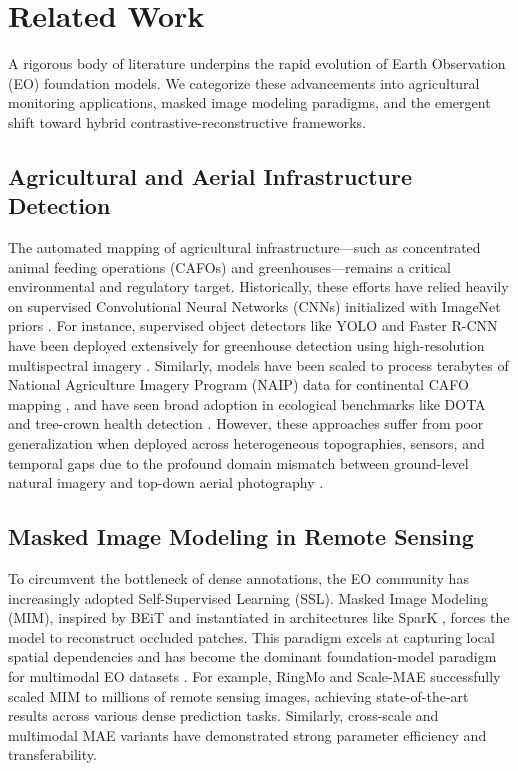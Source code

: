 \section{Related Work}
\label{sec:related_work}

A rigorous body of literature underpins the rapid evolution of Earth Observation (EO) foundation models. We categorize these advancements into agricultural monitoring applications, masked image modeling paradigms, and the emergent shift toward hybrid contrastive-reconstructive frameworks.

\subsection{Agricultural and Aerial Infrastructure Detection}
The automated mapping of agricultural infrastructure---such as concentrated animal feeding operations (CAFOs) and greenhouses---remains a critical environmental and regulatory target. Historically, these efforts have relied heavily on supervised Convolutional Neural Networks (CNNs) initialized with ImageNet priors \cite{wang2022empirical, robinson2021mapping}. For instance, supervised object detectors like YOLO and Faster R-CNN have been deployed extensively for greenhouse detection using high-resolution multispectral imagery \cite{li2020greenhouse}. Similarly, models have been scaled to process terabytes of National Agriculture Imagery Program (NAIP) data for continental CAFO mapping \cite{robinson2021mapping}, and have seen broad adoption in ecological benchmarks like DOTA \cite{xia2017dota, ding2021object} and tree-crown health detection \cite{joshi2025vision}. However, these approaches suffer from poor generalization when deployed across heterogeneous topographies, sensors, and temporal gaps due to the profound domain mismatch between ground-level natural imagery and top-down aerial photography \cite{wang2022empirical, marsocci2024cross}.

\subsection{Masked Image Modeling in Remote Sensing}
To circumvent the bottleneck of dense annotations, the EO community has increasingly adopted Self-Supervised Learning (SSL). Masked Image Modeling (MIM), inspired by BEiT \cite{bao2021beit} and instantiated in architectures like SparK \cite{tian2023spark}, forces the model to reconstruct occluded patches. This paradigm excels at capturing local spatial dependencies and has become the dominant foundation-model paradigm for multimodal EO datasets \cite{sun2023ringmo, wang2024scaling}. For example, RingMo \cite{sun2023ringmo} and Scale-MAE \cite{reed2022scale} successfully scaled MIM to millions of remote sensing images, achieving state-of-the-art results across various dense prediction tasks. Similarly, cross-scale and multimodal MAE variants \cite{tang2024cross, sosa2025multimae} have demonstrated strong parameter efficiency and transferability.

